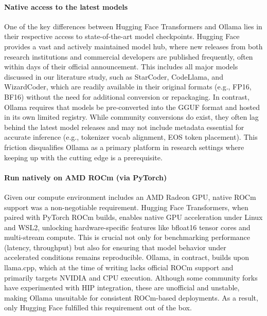 \paragraph{Native access to the latest models}
One of the key differences between Hugging Face Transformers and Ollama lies in their respective access to state-of-the-art model checkpoints. Hugging Face provides a vast and actively maintained model hub, where new releases from both research institutions and commercial developers are published frequently, often within days of their official announcement. This includes all major models discussed in our literature study, such as StarCoder, CodeLlama, and WizardCoder, which are readily available in their original formats (e.g., FP16, BF16) without the need for additional conversion or repackaging. In contrast, Ollama requires that models be pre-converted into the GGUF format and hosted in its own limited registry. While community conversions do exist, they often lag behind the latest model releases and may not include metadata essential for accurate inference (e.g., tokenizer vocab alignment, EOS token placement). This friction disqualifies Ollama as a primary platform in research settings where keeping up with the cutting edge is a prerequisite.

\paragraph{Run natively on AMD ROCm (via PyTorch)}
Given our compute environment includes an AMD Radeon GPU, native ROCm support was a non-negotiable requirement. Hugging Face Transformers, when paired with PyTorch ROCm builds, enables native GPU acceleration under Linux and WSL2, unlocking hardware-specific features like bfloat16 tensor cores and multi-stream compute. This is crucial not only for benchmarking performance (latency, throughput) but also for ensuring that model behavior under accelerated conditions remains reproducible. Ollama, in contract, builds upon llama.cpp, which at the time of writing lacks official ROCm support and primarily targets NVIDIA and CPU execution. Although some community forks have experimented with HIP integration, these are unofficial and unstable, making Ollama unsuitable for consistent ROCm-based deployments. As a result, only Hugging Face fulfilled this requirement out of the box.

